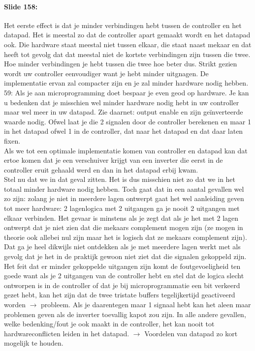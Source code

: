 \documentclass[10pt,a4paper]{book}
\begin{document}
\paragraph{Slide 158:} Het eerste effect is dat je minder verbindingen hebt tussen de controller en het datapad. Het is meestal zo dat de controller apart gemaakt wordt en het datapad ook. Die hardware staat meestal niet tussen elkaar, die staat naast mekaar en dat heeft tot gevolg dat dat meestal niet de kortste verbindingen zijn tussen die twee. Hoe minder verbindingen je hebt tussen die twee hoe beter dus. Strikt gezien wordt uw controller eenvoudiger want je hebt minder uitgnagen. De implementatie ervan zal compacter zijn en je zal minder hardware nodig hebben. 59: %
 Als je aan microprogramming doet bespaar je even geod op hardware. Je kan u bedenken dat je misschien wel minder hardware nodig hebt in uw controller maar wel meer in uw datapad. Zie daarnet: output enable en zijn ge\"inverteerde waarde nodig. Ofwel laat je die 2 signalen door de controller berekenen en maar 1 in het datapad ofwel 1 in de controller, dat naar het datapad en dat daar laten fixen.\\
Als we tot een optimale implementatie komen van controller en datapad kan dat ertoe komen dat je een verschuiver krijgt van een inverter die eerst in de controller eruit gehaald werd en dan in het datapad erbij kwam.\\
Stel nu dat we in dat geval zitten. Het is dus misschien niet zo dat we in het totaal minder hardware nodig hebben. Toch gaat dat in een aantal gevallen wel zo zijn: zolang je niet in meerdere lagen ontwerpt gaat het wel aanleiding geven tot meer hardware: 2 lagenlogica met 2 uitgangen ga je nooit 2 uitgangen met elkaar verbinden. Het gevaar is minstens als je zegt dat als je het met 2 lagen ontwerpt dat je niet zien dat die mekaars complement mogen zijn (ze mogen in theorie ook allebei nul zijn maar het is logisch dat ze mekaars complement zijn).\\
Dat ga je heel dikwijls niet ontdekken als je met meerdere lagen werkt met als gevolg dat je het in de praktijk gewoon niet ziet dat die signalen gekoppeld zijn.\\
Het feit dat er minder gekoppelde uitgangen zijn komt de foutgevoeligheid ten goede want als je 2 uitgangen van de controller hebt en stel dat de logica slecht ontworpen is in de controller of dat je bij microprogrammatie een bit verkeerd gezet hebt, kan het zijn dat de twee tristate buffers tegelijkertijd geactiveerd worden $\rightarrow$ probleem. Als je daarentegen maar 1 signaal hebt kan het aleen maar problemen geven als de inverter toevallig kapot zou zijn. In alle andere gevallen, welke bedenking/fout je ook maakt in de controller, het kan nooit tot hardwareconflicten leiden in het datapad. $\rightarrow$ Voordelen van datapad zo kort mogelijk te houden.\\
\end{document}
